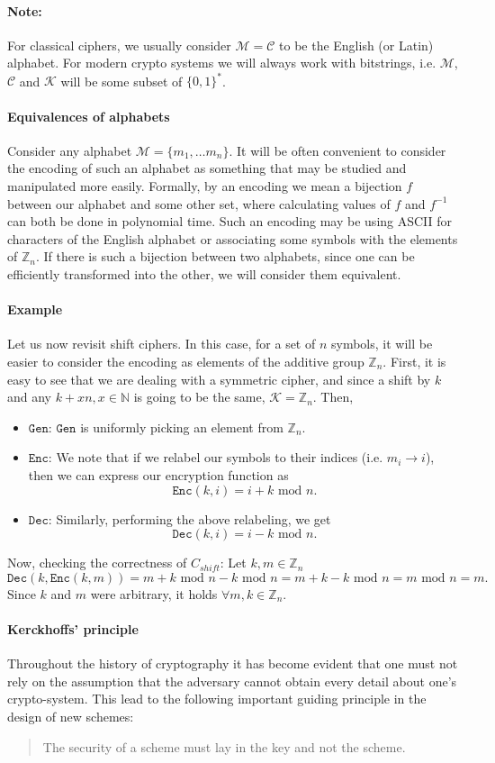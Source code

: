 \documentclass{article}
\theoremstyle{definition}
\newcommand{\Enc}{\texttt{Enc}}
\newcommand{\Dec}{\texttt{Dec}}
\newcommand{\Gen}{\texttt{Gen}}
\newcommand{\M}{\mathcal{M}}
\renewcommand{\C}{\mathcal{C}}
\newcommand{\K}{\mathcal{K}}
\newcommand{\Int}{\mathbb{Z}}
\renewcommand{\mod}{\,\,\text{mod}\,\,}
\begin{document}
\paragraph{Note:} For classical ciphers, we usually consider $\M = \C$ to be the
English (or Latin) alphabet. For modern crypto systems we will always work with
bitstrings, i.e. $\M$, $\C$ and $\K$ will be some subset of $\{0, 1\}^*$.
\paragraph{Equivalences of alphabets}
Consider any alphabet $\M = \{m_1, \hdots m_n\}$. It will be 
often convenient to consider the encoding of such an alphabet as something that
may be studied and manipulated more easily. Formally, by an encoding we mean a
bijection $f$ between our alphabet and some other set, where calculating values
of $f$ and $f^{-1}$ can both be done in polynomial time. Such an encoding may
be using ASCII for characters of the English alphabet or associating some
symbols with the elements of $\Int_n$. If there is such a bijection between
two alphabets, since one can be efficiently transformed into the other, we will
consider them equivalent.

\paragraph{Example}
Let us now revisit shift ciphers. In this case, for a set of $n$ symbols, it
will be easier to consider the encoding as elements of the additive group
$\Int_n$. First, it is easy to see that we are dealing with a
symmetric cipher, and since a shift by $k$ and any $k + xn, x \in \mathbb{N}$ is
going to be the same, $\K = \Int_n$. Then,
\begin{itemize}
\item $\Gen$: $\Gen$ is uniformly picking an element from $\Int_n$.
\item $\Enc$: We note that if we relabel our symbols to their
  indices (i.e. $m_i \to i$), then we can express our encryption function as
  \[
    \Enc(k, i) = i + k \mod n.
  \]
\item $\Dec$: Similarly, performing the above relabeling, we get
  \[
    \Dec(k, i) = i - k \mod n.
  \]
\end{itemize}
Now, checking the correctness of $C_{shift}$: Let $k, m \in \Int_n$
\[
  \Dec(k, \Enc(k, m)) = m + k \mod n - k \mod n = m + k - k \mod n = m \mod n = m.
\]
Since $k$ and $m$ were arbitrary, it holds $\forall m, k \in \Int_n$.
\paragraph{Kerckhoffs' principle}
Throughout the history of cryptography it has become evident that one must not
rely on the assumption that the adversary cannot obtain every detail about one's
crypto-system. This lead to the following important guiding principle in the
design of new schemes:
\begin{quotation}
The security of a scheme must lay in the key and not the scheme.
\end{quotation}
\end{document}
